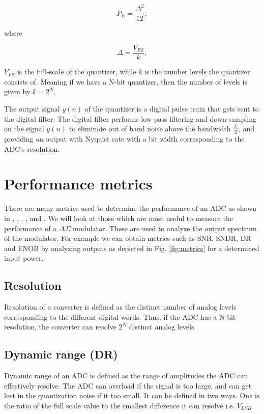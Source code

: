 \begin{equation}
    P_E = \frac{\Delta^2}{12},
\end{equation}

where 

\begin{equation}
    \Delta = \frac{V_{FS}}{k},
\end{equation}

$V_{FS}$ is the full-scale of the quantizer, while $k$ is the number levels the quantizer consists of. Meaning if we have a N-bit quantizer, then the number of levels is given by $k = 2^N$. 

The output signal $y(n)$ of the quantizer is a digital pulse train that gets sent to the digital filter. The digital filter performs low-pass filtering and down-sampling on the signal $y(n)$ to eliminate out of band noise above the bandwidth $\frac{f_s}{2}$, and providing an output with Nyquist rate with a bit width corresponding to the ADC's resolution. 

\section{Performance metrics}

There are many metrics used to determine the performance of an ADC as shown in \cite{Allen}, \cite{Johns}, \cite{Razavi}, \cite{Barker}, \cite{Malo} and \cite{Plass}. We will look at those which are most useful to measure the performance of a $\Delta\Sigma$ modulator. These are used to analyze the output spectrum of the modulator. For example we can obtain metrics such as SNR, SNDR, DR and ENOB by analyzing outputs as depicted in Fig. \ref{fig:metrics} for a determined input power. 

\subsection{Resolution}
Resolution of a converter is defined as the distinct number of analog levels corresponding to the different digital words. Thus, if the ADC has a N-bit resolution, the converter can resolve $2^N$ distinct analog levels.

\subsection{Dynamic range (DR)}
Dynamic range of an ADC is defined as the range of amplitudes the ADC can effectively resolve. The ADC can overload if the signal is too large, and can get lost in the quantization noise if it too small. It can be defined in two ways. One is the ratio of the full scale value to the smallest difference it can resolve i.e. $V_{LSB}$

